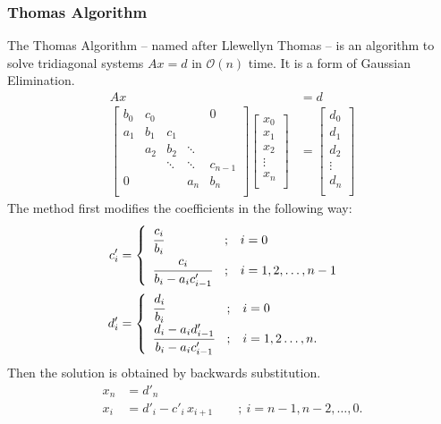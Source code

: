 \documentclass[a4paper]{article}
\begin{document}
\subsubsection{Thomas Algorithm}
The Thomas Algorithm -- named after Llewellyn Thomas -- is an algorithm to solve tridiagonal systems $Ax = d$ in $\mathcal O(n)$ time.
It is a form of Gaussian Elimination.
\begin{align}
	Ax &= d \\
\begin{bmatrix}
   {b_0} & {c_0} & {   } & {   } & { 0 } \\
   {a_1} & {b_1} & {c_1} & {   } & {   } \\
   {   } & {a_2} & {b_2} & \ddots & {   } \\
   {   } & {   } & \ddots & \ddots & {c_{n-1}}\\
   { 0 } & {   } & {   } & {a_n} & {b_n}\\
\end{bmatrix}
\begin{bmatrix}
   {x_0 }  \\
   {x_1 }  \\
   {x_2 }  \\
   \vdots   \\
   {x_n }  \\
\end{bmatrix}
&=
\begin{bmatrix}
   {d_0 }  \\
   {d_1 }  \\
   {d_2 }  \\
   \vdots   \\
   {d_n }  \\
\end{bmatrix}
\end{align}
The method first modifies the coefficients in the following way:
\begin{align}
	c'_i &=
\begin{cases}
\begin{array}{lcl}
  \cfrac{c_i}{b_i}                  & ; & i = 0 \\
  \cfrac{c_i}{b_i - a_i c'_{i - 1}} & ; & i = 1, 2, \dots, n-1 \\
\end{array}
\end{cases} \\
d'_i &=
\begin{cases}
\begin{array}{lcl}
  \cfrac{d_i}{b_i}                  & ; & i = 0 \\
  \cfrac{d_i - a_i d'_{i - 1}}{b_i - a_i c'_{i - 1}} & ; & i = 1, 2 \dots, n. \\
\end{array}
\end{cases}
\end{align}
Then the solution is obtained by backwards substitution.
\begin{align}
	x_n &= d'_n \\
	x_i &= d'_i - c'_i\, x_{i + 1} \qquad ; \ i = n - 1, n - 2, \ldots, 0.
\end{align}
\end{document}
